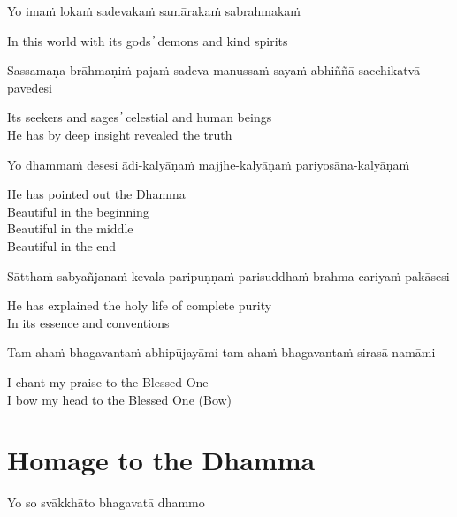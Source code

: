 Yo imaṁ lokaṁ sadevakaṁ samārakaṁ sabrahmakaṁ

\begin{cprenglish}
  In this world with its gods ̓ demons and kind spirits
\end{cprenglish}

Sassamaṇa-brāhmaṇiṁ pajaṁ sadeva-manussaṁ sayaṁ abhiññā sacchikatvā pavedesi

\begin{cprenglish}
  Its seekers and sages  ̓  celestial and human beings\\
  He has by deep insight revealed the truth
\end{cprenglish}

Yo dhammaṁ desesi ādi-kalyāṇaṁ majjhe-kalyāṇaṁ pariyosāna-kalyāṇaṁ

\begin{cprenglish}
  He has pointed out the Dhamma\\
  Beautiful in the beginning\\
  Beautiful in the middle\\
  Beautiful in the end\\
\end{cprenglish}

Sātthaṁ sabyañjanaṁ kevala-paripuṇṇaṁ parisuddhaṁ brahma-cariyaṁ pakāsesi

\begin{cprenglish}
  He has explained the holy life of complete purity\\
  In its essence and conventions
\end{cprenglish}

Tam-ahaṁ bhagavantaṁ abhipūjayāmi tam-ahaṁ bhagavantaṁ sirasā namāmi
\begin{cprenglish}
  I chant my praise to the Blessed One\\
  I bow my head to the Blessed One (Bow)
\end{cprenglish}

\section{Homage to the Dhamma}

\begin{leader}
\end{leader}
\begin{leader}
\end{leader}

Yo so svākkhāto bhagavatā dhammo

